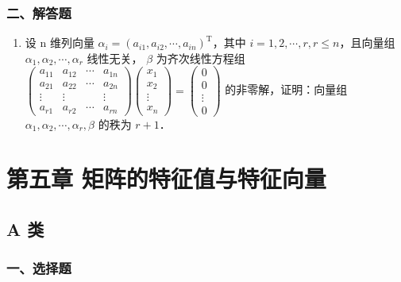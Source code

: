 \documentclass[12pt, a4paper]{ctexart}
\begin{document}
\subsubsection*{二、解答题}

\begin{enumerate}[start=4]
    \item 设 n 维列向量 $ \alpha_{i}=(a_{i1},a_{i2},\cdots,a_{in})^{\mathrm{T}} $，其中 $ i=1,2,\cdots,r,r\leq n $，且向量组 $ \alpha_{1},\alpha_{2},\cdots,\alpha_{r} $ 线性无关， $ \beta $ 为齐次线性方程组 $ \begin{pmatrix} a_{11} & a_{12} & \cdots & a_{1n} \\ a_{21} & a_{22} & \cdots & a_{2n} \\ \vdots & \vdots & & \vdots \\ a_{r1} & a_{r2} & \cdots & a_{rn} \end{pmatrix}\begin{pmatrix} x_{1} \\ x_{2} \\ \vdots \\ x_{n} \end{pmatrix}=\begin{pmatrix} 0 \\ 0 \\ \vdots \\ 0 \end{pmatrix} $ 的非零解，证明：向量组 $ \alpha_{1},\alpha_{2},\cdots,\alpha_{r},\beta $ 的秩为 $ r+1 $．
\end{enumerate}

\section{第五章 矩阵的特征值与特征向量}

\subsection{A 类}

\subsubsection*{一、选择题}
\end{document}
